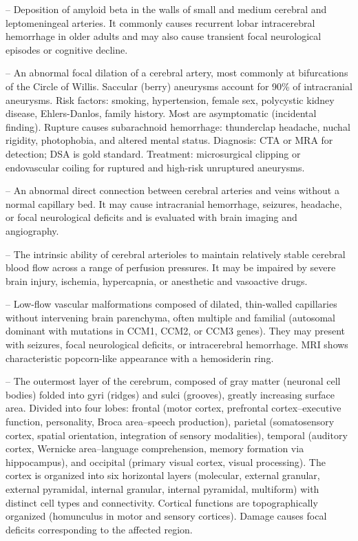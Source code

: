 -- Deposition of amyloid beta in the walls of small and medium cerebral and leptomeningeal arteries. It commonly causes recurrent lobar intracerebral hemorrhage in older adults and may also cause transient focal neurological episodes or cognitive decline.

-- An abnormal focal dilation of a cerebral artery, most commonly at bifurcations of the Circle of Willis. Saccular (berry) aneurysms account for 90\% of intracranial aneurysms. Risk factors: smoking, hypertension, female sex, polycystic kidney disease, Ehlers-Danlos, family history. Most are asymptomatic (incidental finding). Rupture causes subarachnoid hemorrhage: thunderclap headache, nuchal rigidity, photophobia, and altered mental status. Diagnosis: CTA or MRA for detection; DSA is gold standard. Treatment: microsurgical clipping or endovascular coiling for ruptured and high-risk unruptured aneurysms.

-- An abnormal direct connection between cerebral arteries and veins without a normal capillary bed. It may cause intracranial hemorrhage, seizures, headache, or focal neurological deficits and is evaluated with brain imaging and angiography.

-- The intrinsic ability of cerebral arterioles to maintain relatively stable cerebral blood flow across a range of perfusion pressures. It may be impaired by severe brain injury, ischemia, hypercapnia, or anesthetic and vasoactive drugs.

-- Low-flow vascular malformations composed of dilated, thin-walled capillaries without intervening brain parenchyma, often multiple and familial (autosomal dominant with mutations in CCM1, CCM2, or CCM3 genes). They may present with seizures, focal neurological deficits, or intracerebral hemorrhage. MRI shows characteristic popcorn-like appearance with a hemosiderin ring.

-- The outermost layer of the cerebrum, composed of gray matter (neuronal cell bodies) folded into gyri (ridges) and sulci (grooves), greatly increasing surface area. Divided into four lobes: frontal (motor cortex, prefrontal cortex--executive function, personality, Broca area--speech production), parietal (somatosensory cortex, spatial orientation, integration of sensory modalities), temporal (auditory cortex, Wernicke area--language comprehension, memory formation via hippocampus), and occipital (primary visual cortex, visual processing). The cortex is organized into six horizontal layers (molecular, external granular, external pyramidal, internal granular, internal pyramidal, multiform) with distinct cell types and connectivity. Cortical functions are topographically organized (homunculus in motor and sensory cortices). Damage causes focal deficits corresponding to the affected region.

